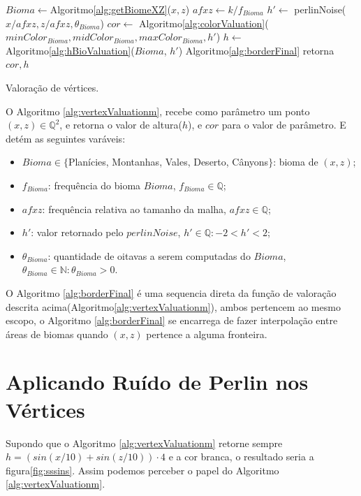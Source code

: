 \begin{algorithm}[H]\label{alg:vertexValuationm}%
    $Bioma \leftarrow $Algoritmo\ref{alg:getBiomeXZ}($x, z$)\;
    $afxz \leftarrow k/f_{Bioma}$\;
    $h' \leftarrow$ perlinNoise($x/afxz, z/afxz, \theta_{Bioma}$)\;
    $cor \leftarrow$ Algoritmo\ref{alg:colorValuation}($minColor_{Bioma}, midColor_{Bioma}, maxColor_{Bioma}, h'$)\;
    $h \leftarrow$ Algoritmo\ref{alg:hBioValuation}($Bioma$, $h'$)\;
    Algoritmo\ref{alg:borderFinal}\;
    retorna $cor, h$\;
    \caption{Valoração de vértices.}
\end{algorithm}
O Algoritmo \ref{alg:vertexValuationm}, recebe como parâmetro um
ponto $(x, z) \in \mathbb{Q}^{2}$, e retorna o valor de altura($h$), e $cor$ para o valor de parâmetro.
E detém as seguintes varáveis:
\begin{itemize}
    \item $Bioma \in \{$Planícies, Montanhas, Vales, Deserto, Cânyons$\}$: bioma de $(x, z)$;
    \item $f_{Bioma}$: frequência do bioma $Bioma$, $f_{Bioma} \in \mathbb{Q}$;
    \item $afxz$: frequência relativa ao tamanho da malha, $afxz \in \mathbb{Q}$;
    \item $h'$: valor retornado pelo $perlinNoise$, $h' \in \mathbb{Q}: -2 < h' < 2$;
    \item $\theta_{Bioma}$: quantidade de oitavas a serem computadas do $Bioma$, $\theta_{Bioma} \in \mathbb{N}: \theta_{Bioma} > 0$.
\end{itemize}


O Algoritmo \ref{alg:borderFinal} é uma sequencia direta da função de valoração 
descrita acima(Algoritmo\ref{alg:vertexValuationm}), ambos pertencem ao mesmo escopo, o Algoritmo \ref{alg:borderFinal}
se encarrega de fazer interpolação entre áreas de biomas quando $(x, z)$ pertence
a alguma fronteira.

\section{Aplicando Ruído de Perlin nos Vértices}
Supondo que o Algoritmo \ref{alg:vertexValuationm} retorne sempre $h = (sin(x/10) + sin(z/10)) \cdot 4$ e 
a cor branca, o resultado seria a figura\ref{fig:sssins}. Assim podemos perceber o papel do Algoritmo \ref{alg:vertexValuationm}.

